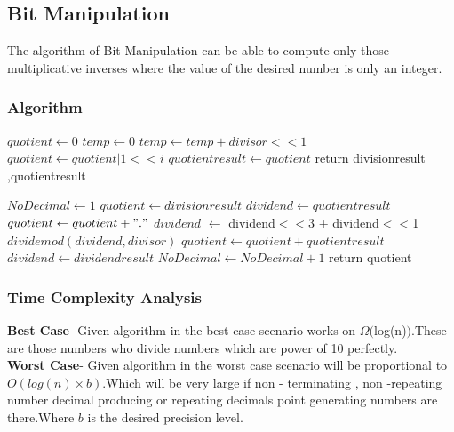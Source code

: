\documentclass[twocolumn]{article}      %
\begin{document}
\subsection{Bit Manipulation}
The algorithm of Bit Manipulation can be able to compute only those multiplicative inverses where the value of the desired number is only an integer. 
\subsubsection{Algorithm}
\begin{algorithm}
\begin{algorithmic}[1]
\State $quotient \gets 0$
\State $temp \gets 0$
\State $temp \gets temp +divisor <<1$
\State $ quotient \gets quotient | 1<<i$
\State $quotientresult \gets quotient$
\EndIf
\EndFor
\State return divisionresult ,quotientresult
\EndProcedure
\end{algorithmic}
\end{algorithm}
\begin{algorithm}
\begin{algorithmic}[1]
\State $NoDecimal \gets 1$
\State $quotient \gets divisionresult$
\State $dividend \gets quotientresult$
\State $quotient \gets quotient+"."$
\EndIf
{}
\State $dividend$ $\gets$ dividend$<<$3 + dividend$<<$1
\State $dividemod(dividend,divisor)$
\State $quotient \gets quotient + quotientresult$
\State $dividend \gets dividendresult$
\State $NoDecimal \gets NoDecimal +1$
\EndWhile
\State return quotient
\EndProcedure
\end{algorithmic}
\end{algorithm}
\begin{algorithm}
\end{algorithm}
\subsubsection{Time Complexity Analysis}
\textbf{Best Case}- Given algorithm in the best case scenario works on $\Omega($log(n)$)$.These are those numbers who divide numbers which are power of 10 perfectly.\\
\textbf{Worst Case}- Given algorithm in the worst case scenario will be proportional to $O(log(n)\times{b})$.Which will be very large if non - terminating , non -repeating number decimal producing or repeating decimals point generating numbers are there.Where $b$ is the desired precision level. 
\end{document}
